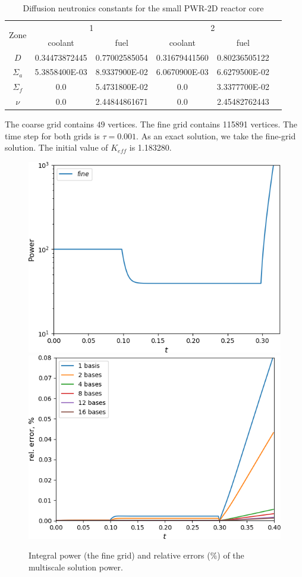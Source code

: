 \documentclass[10pt]{article}
\begin{document}
\begin{table}[h]
\caption{Diffusion neutronics constants for the small PWR-2D reactor core}
\label{t1}
\begin{center}
\begin{tabular}{|c|c|c|c|c|c|}
\hline
\multirow{2}{*}{Zone} & \multicolumn{2}{c|}{1} & \multicolumn{2}{c|}{2} \\
\cline{2-5}
& coolant & fuel & coolant & fuel \\
\hline
$D$ & 0.34473872445 & 0.77002585054 & 0.31679441560 & 0.80236505122 \\
$\Sigma_a$ & 5.3858400E-03 & 8.9337900E-02 & 6.0670900E-03 & 6.6279500E-02 \\
$\Sigma_{f}$ & 0.0 & 5.4731800E-02 & 0.0 & 3.3377700E-02 \\
$\nu$ & 0.0 & 2.44844861671 & 0.0 & 2.45482762443 \\
\hline
\end{tabular}
\end{center}
\end{table}

The coarse grid contains $49$ vertices.
The fine grid contains 115891 vertices. 
The time step for both grids is $\tau = 0.001$.
As an exact solution, we take the fine-grid solution.
The initial value of $K_{eff}$ is 1.183280. 

\begin{figure}[h!]
\centering
\includegraphics[width=0.45\linewidth]{power_fine.png} 
\hspace{2em}
\includegraphics[width=0.45\linewidth]{power.png} 
\caption{Integral power (the fine grid) and relative errors ($\%$) of the multiscale solution power.}
\label{p4}
\end{figure}
 
\end{document}
